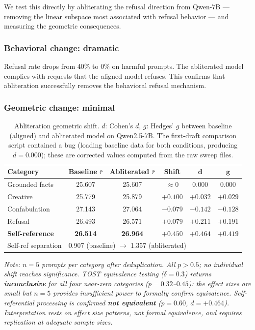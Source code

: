 \documentclass[11pt,a4paper]{article}
\begin{document}
We test this directly by abliterating \citep{arditi2024refusal,heretic2026} the refusal direction from Qwen-7B --- removing the linear subspace most associated with refusal behavior --- and measuring the geometric consequences.

\subsubsection{Behavioral change: dramatic}

Refusal rate drops from 40\% to 0\% on harmful prompts. The abliterated model complies with requests that the aligned model refuses. This confirms that abliteration successfully removes the behavioral refusal mechanism.

\subsubsection{Geometric change: minimal}

\begin{table}[H]
\centering
\caption{Abliteration geometric shift. $d$: Cohen's $d$, $g$: Hedges' $g$ between baseline (aligned) and abliterated model on Qwen2.5-7B. The first-draft comparison script contained a bug (loading baseline data for both conditions, producing $d = 0.000$); these are corrected values computed from the raw sweep files.}
\label{tab:abliteration}
\begin{tabular}{lccccc}
\toprule
\textbf{Category} & \textbf{Baseline $\bar{r}$} & \textbf{Abliterated $\bar{r}$} & \textbf{Shift} & $\bm{d}$ & $\bm{g}$ \\
\midrule
Grounded facts & 25.607 & 25.607 & $\approx 0$ & $0.000$ & $0.000$ \\
Creative & 25.779 & 25.879 & $+0.100$ & $+0.032$ & $+0.029$ \\
Confabulation & 27.143 & 27.064 & $-0.079$ & $-0.142$ & $-0.128$ \\
Refusal & 26.493 & 26.571 & $+0.079$ & $+0.211$ & $+0.191$ \\
\textbf{Self-reference} & \textbf{26.514} & \textbf{26.964} & $\bm{+0.450}$ & $\bm{+0.464}$ & $\bm{+0.419}$ \\
\midrule
Self-ref separation & \multicolumn{5}{l}{0.907 (baseline) $\to$ 1.357 (abliterated)} \\
\bottomrule
\end{tabular}
\end{table}

\noindent\emph{Note: $n = 5$ prompts per category after deduplication. All $p > 0.5$; no individual shift reaches significance. TOST equivalence testing ($\delta = 0.3$) returns \textbf{inconclusive} for all four near-zero categories ($p = 0.32$--$0.45$): the effect sizes are small but $n = 5$ provides insufficient power to formally confirm equivalence. Self-referential processing is confirmed \textbf{not equivalent} ($p = 0.60$, $d = +0.464$). Interpretation rests on effect size patterns, not formal equivalence, and requires replication at adequate sample sizes.}
\end{document}
